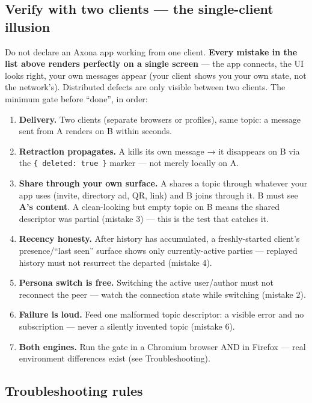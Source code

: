 \documentclass[
  nobib]{tufte-handout}
\providecommand{\tightlist}{%
  \setlength{\itemsep}{0pt}\setlength{\parskip}{0pt}}
\begin{document}
\subsection{Verify with two clients --- the single-client
illusion}\label{verify-with-two-clients-the-single-client-illusion}

Do not declare an Axona app working from one client. \textbf{Every
mistake in the list above renders perfectly on a single screen} --- the
app connects, the UI looks right, your own messages appear (your client
shows you your own state, not the network's). Distributed defects are
only visible between two clients. The minimum gate before ``done'', in
order:

\begin{enumerate}
\def\labelenumi{\arabic{enumi}.}
\tightlist
\item
  \textbf{Delivery.} Two clients (separate browsers or profiles), same
  topic: a message sent from A renders on B within seconds.
\item
  \textbf{Retraction propagates.} A kills its own message → it
  disappears on B via the \texttt{\{\ deleted:\ true\ \}} marker --- not
  merely locally on A.
\item
  \textbf{Share through your own surface.} A shares a topic through
  whatever your app uses (invite, directory ad, QR, link) and B joins
  through it. B must see \textbf{A's content}. A clean-looking but empty
  topic on B means the shared descriptor was partial (mistake 3) ---
  this is the test that catches it.
\item
  \textbf{Recency honesty.} After history has accumulated, a
  freshly-started client's presence/``last seen'' surface shows only
  currently-active parties --- replayed history must not resurrect the
  departed (mistake 4).
\item
  \textbf{Persona switch is free.} Switching the active user/author must
  not reconnect the peer --- watch the connection state while switching
  (mistake 2).
\item
  \textbf{Failure is loud.} Feed one malformed topic descriptor: a
  visible error and no subscription --- never a silently invented topic
  (mistake 6).
\item
  \textbf{Both engines.} Run the gate in a Chromium browser AND in
  Firefox --- real environment differences exist (see Troubleshooting).
\end{enumerate}

\subsection{Troubleshooting rules}\label{troubleshooting-rules}
\end{document}
